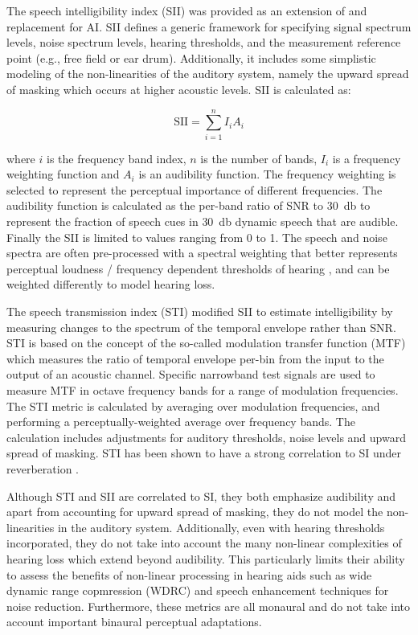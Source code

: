 The speech intelligibility index (SII) \citep{ansi1997methods} was provided as an extension of and replacement for AI. SII defines a generic framework for specifying signal spectrum levels, noise spectrum levels, hearing thresholds, and the measurement reference point (e.g., free field or ear drum). Additionally, it includes some simplistic modeling of the non-linearities of the auditory system, namely the upward spread of masking which occurs at higher acoustic levels. SII is calculated as:

\begin{equation}
	\mathrm{SII} = \sum_{i=1}^{n}I_iA_i
\end{equation}

\noindent 
where $i$ is the frequency band index, $n$ is the number of bands, $I_i$ is a frequency weighting function and $A_i$ is an audibility function. The frequency weighting is selected to represent the perceptual importance of different frequencies.  The audibility function is calculated as the per-band ratio of SNR to \qty{30}{\decibel} to represent the fraction of speech cues in \qty{30}{\decibel} dynamic speech that are audible. Finally the SII is limited to values ranging from 0 to 1. The speech and noise spectra are often pre-processed with a spectral weighting that better represents perceptual loudness / frequency dependent thresholds of hearing \citep[e.g., A-weighting which approximates 40-phon equal-loudness contour, ][]{iec2003Aweighting}, and can be weighted differently to model hearing loss. 

The speech transmission index (STI) \citep{iec2003sti} modified SII to estimate intelligibility by measuring changes to the spectrum of the temporal envelope rather than SNR. STI is based on the concept of the so-called modulation transfer function (MTF) which measures the ratio of temporal envelope per-bin from the input to the output of an acoustic channel. Specific narrowband test signals are used to measure MTF in octave frequency bands for a range of modulation frequencies. The STI metric is calculated by averaging over modulation frequencies, and performing a perceptually-weighted average over frequency bands. The calculation includes adjustments for auditory thresholds, noise levels and upward spread of masking. STI has been shown to have a strong correlation to SI under reverberation \citep{schepker2016perceived}.

Although STI and SII are correlated to SI, they both emphasize audibility and apart from accounting for upward spread of masking, they do not model the non-linearities in the auditory system. Additionally, even with hearing thresholds incorporated, they do not take into account the many non-linear complexities of hearing loss which extend beyond audibility. This particularly limits their ability to assess the benefits of non-linear processing in hearing aids such as wide dynamic range copmression (WDRC) and speech enhancement techniques for noise reduction. Furthermore, these metrics are all monaural and do not take into account important binaural perceptual adaptations.

